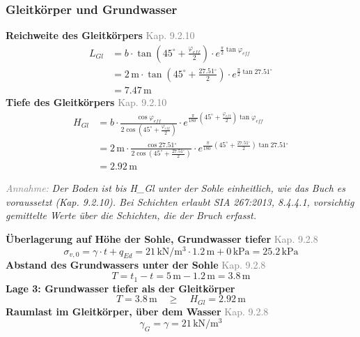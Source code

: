 \documentclass[11pt,a4paper]{article}
\newcommand{\normref}[1]{{\small\textcolor{gray}{#1}}}
\newcommand{\hinweis}[2]{\par\noindent\textcolor{gray}{\textit{#1:}} \textit{#2}\par}
\begin{document}
\subsubsection{Gleitkörper und Grundwasser}
\noindent\textbf{Reichweite des Gleitkörpers} \hfill \normref{Kap. 9.2.10}
\begin{equation*}
\begin{aligned}
  L_{Gl} &= b \cdot \tan\left(45^\circ + \frac{\varphi_{eff}}{2}\right) \cdot e^{\frac{\pi}{2} \tan \varphi_{eff}} \\
  &= 2\,\mathrm{m} \cdot \tan\left(45^\circ + \frac{27.51{}^{\circ}}{2}\right) \cdot e^{\frac{\pi}{2} \tan 27.51{}^{\circ}} \\
  &= 7.47\,\mathrm{m}
\end{aligned}
\end{equation*}
\noindent\textbf{Tiefe des Gleitkörpers} \hfill \normref{Kap. 9.2.10}
\begin{equation*}
\begin{aligned}
  H_{Gl} &= b \cdot \frac{\cos \varphi_{eff}}{2 \cos\left(45^\circ + \frac{\varphi_{eff}}{2}\right)} \cdot e^{\frac{\pi}{180^\circ}\left(45^\circ + \frac{\varphi_{eff}}{2}\right) \tan \varphi_{eff}} \\
  &= 2\,\mathrm{m} \cdot \frac{\cos 27.51{}^{\circ}}{2 \cos\left(45^\circ + \frac{27.51{}^{\circ}}{2}\right)} \cdot e^{\frac{\pi}{180^\circ}\left(45^\circ + \frac{27.51{}^{\circ}}{2}\right) \tan 27.51{}^{\circ}} \\
  &= 2.92\,\mathrm{m}
\end{aligned}
\end{equation*}
\hinweis{Annahme}{Der Boden ist bis H\_Gl unter der Sohle einheitlich, wie das Buch es voraussetzt (Kap. 9.2.10). Bei Schichten erlaubt SIA 267:2013, 8.4.4.1, vorsichtig gemittelte Werte über die Schichten, die der Bruch erfasst.}
\noindent\textbf{Überlagerung auf Höhe der Sohle, Grundwasser tiefer} \hfill \normref{Kap. 9.2.8}
\begin{equation*}
\sigma_{v,0} = \gamma \cdot t + q_{Ed} = 21\,\mathrm{kN}/\mathrm{m}^{3} \cdot 1.2\,\mathrm{m} + 0\,\mathrm{kPa} = 25.2\,\mathrm{kPa}
\end{equation*}
\noindent\textbf{Abstand des Grundwassers unter der Sohle} \hfill \normref{Kap. 9.2.8}
\begin{equation*}
T = t_1 - t = 5\,\mathrm{m} - 1.2\,\mathrm{m} = 3.8\,\mathrm{m}
\end{equation*}
\noindent\textbf{Lage 3: Grundwasser tiefer als der Gleitkörper}
\begin{equation*}
T = 3.8\,\mathrm{m} \quad \ge \quad H_{Gl} = 2.92\,\mathrm{m}
\end{equation*}
\noindent\textbf{Raumlast im Gleitkörper, über dem Wasser} \hfill \normref{Kap. 9.2.8}
\begin{equation*}
\gamma_G = \gamma = 21\,\mathrm{kN}/\mathrm{m}^{3}
\end{equation*}
\end{document}
